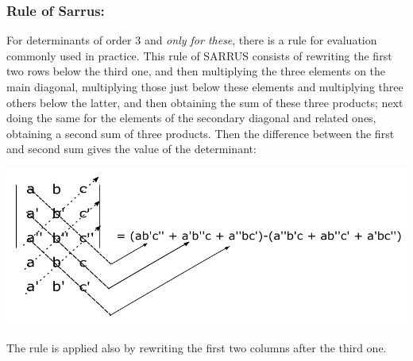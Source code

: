 \documentclass[11pt]{amsbook}
\begin{document}
\subsubsection{Rule of Sarrus:}
	For determinants of order 3 and \textit{only for these}, there is a rule for evaluation commonly used in practice. This rule of SARRUS  consists of rewriting the first two rows below the 		third one, and then multiplying the three elements on the main diagonal, multiplying those just below these elements and multiplying three others below the latter, and then obtaining 		the sum of these three products; next doing the same for the elements of the secondary diagonal and related ones, obtaining a second sum of three products. Then the difference 		between the first and second sum gives the value of the determinant:
	\begin{flushleft}\includegraphics[width=1.0\textwidth,keepaspectratio=true]{images/b1p2-242-fig01}\end{flushleft}
\quad 
The rule is applied also by rewriting the first two columns after the third one.







\end{document}
